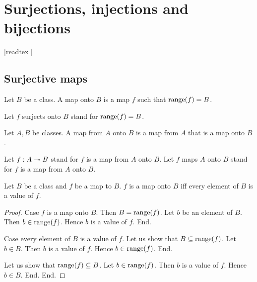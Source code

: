 \documentclass[../../set-theory/set-theory.tex]{subfiles}
\begin{document}
  \chapter{Surjections, injections and bijections}\label{injections-surjections-bijections}


  \begin{forthel}

    [readtex ]

  \end{forthel}


  \section{Surjective maps}

  \begin{forthel}
    \begin{definition}
      Let $B$ be a class.
      A map onto $B$ is a map $f$ such that $\operatorname{range}(f) = B$.
    \end{definition}

    Let $f$ surjects onto $B$ stand for $\operatorname{range}(f) = B$.
  \end{forthel}

  \begin{forthel}
    \begin{definition}
      Let $A, B$ be classes.
      A map from $A$ onto $B$ is a map from $A$ that is a map onto $B$.
    \end{definition}

    Let $f: A \twoheadrightarrow B$ stand for $f$ is a map from $A$ onto $B$.
    Let $f$ maps $A$ onto $B$ stand for $f$ is a map from $A$ onto $B$.
  \end{forthel}

  \begin{forthel}
    \begin{proposition}
      Let $B$ be a class and $f$ be a map to $B$.
      $f$ is a map onto $B$ iff every element of $B$ is a value of $f$.
    \end{proposition}
    \begin{proof}
      Case $f$ is a map onto $B$.
        Then $B = \operatorname{range}(f)$.
        Let $b$ be an element of $B$.
        Then $b \in \operatorname{range}(f)$.
        Hence $b$ is a value of $f$.
      End.

      Case every element of $B$ is a value of $f$.
        Let us show that $B \subseteq \operatorname{range}(f)$.
          Let $b \in B$.
          Then $b$ is a value of $f$.
          Hence $b \in \operatorname{range}(f)$.
        End.

        Let us show that $\operatorname{range}(f) \subseteq B$.
          Let $b \in \operatorname{range}(f)$.
          Then $b$ is a value of $f$.
          Hence $b \in B$.
        End.
      End.
    \end{proof}
  \end{forthel}
\end{document}
